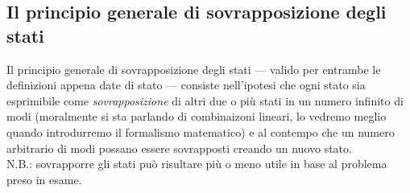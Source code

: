\documentclass[../../../../Meccanica_quantistica]{subfiles}
\begin{document}
\subsection{Il principio generale di sovrapposizione degli stati}
    \label{
      subsec:il-principio-generale-di-sovrapposizione-degli-stati
    }
    Il principio generale di sovrapposizione degli stati — valido
    per entrambe le definizioni appena date di stato — consiste
    nell'ipotesi che ogni stato sia esprimibile come
    \textit{sovrapposizione} di altri due o più stati in un numero
    infinito di modi (moralmente si sta parlando di combinaizoni
    lineari, lo vedremo meglio quando introdurremo il formalismo
    matematico) e al contempo che un numero arbitrario di modi
    possano essere sovrapposti creando un nuovo stato. \\
    N.B.: sovrapporre gli stati può risultare più o meno utile in
    base al problema preso in esame.
\end{document}
